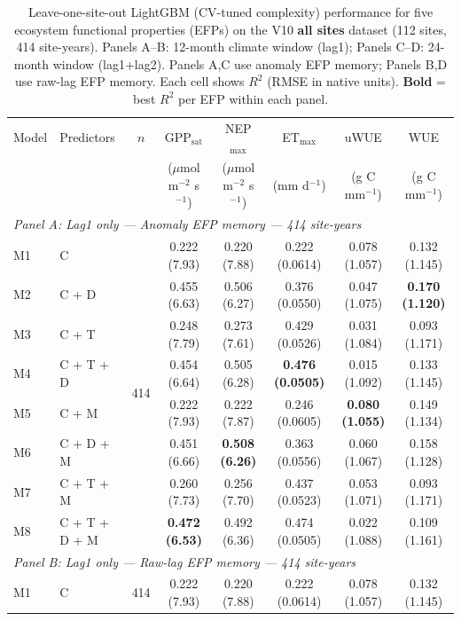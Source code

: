 \begin{table}[htbp]
\centering
\caption{Leave-one-site-out LightGBM (CV-tuned complexity) performance for five ecosystem functional properties (EFPs) on the V10 \textbf{all sites} dataset (112 sites, 414 site-years). Panels A--B: 12-month climate window (lag1); Panels C--D: 24-month window (lag1+lag2). Panels A,C use anomaly EFP memory; Panels B,D use raw-lag EFP memory. Each cell shows $R^2$ (RMSE in native units). \textbf{Bold} = best $R^2$ per EFP within each panel.}
\label{tab:LGBtuned_LOSO_v10_all_sites}
\footnotesize
\setlength{\tabcolsep}{4pt}
\begin{tabular}{llcccccc}
\toprule
Model & Predictors & $n$ & GPP$_\mathrm{sat}$ & NEP$_\mathrm{max}$ & ET$_\mathrm{max}$ & uWUE & WUE \\
  &  &  & ($\mu$mol m$^{-2}$ s$^{-1}$) & ($\mu$mol m$^{-2}$ s$^{-1}$) & (mm d$^{-1}$) & (g C mm$^{-1}$) & (g C mm$^{-1}$) \\
\midrule
\multicolumn{8}{l}{\textit{Panel A: Lag1 only --- Anomaly EFP memory --- 414 site-years}} \\
\midrule
M1 & C & \multirow{8}{*}{414} & 0.222 (7.93) & 0.220 (7.88) & 0.222 (0.0614) & 0.078 (1.057) & 0.132 (1.145) \\
M2 & C + D &  & 0.455 (6.63) & 0.506 (6.27) & 0.376 (0.0550) & 0.047 (1.075) & \textbf{0.170 (1.120)} \\
M3 & C + T &  & 0.248 (7.79) & 0.273 (7.61) & 0.429 (0.0526) & 0.031 (1.084) & 0.093 (1.171) \\
M4 & C + T + D &  & 0.454 (6.64) & 0.505 (6.28) & \textbf{0.476 (0.0505)} & 0.015 (1.092) & 0.133 (1.145) \\
M5 & C + M &  & 0.222 (7.93) & 0.222 (7.87) & 0.246 (0.0605) & \textbf{0.080 (1.055)} & 0.149 (1.134) \\
M6 & C + D + M &  & 0.451 (6.66) & \textbf{0.508 (6.26)} & 0.363 (0.0556) & 0.060 (1.067) & 0.158 (1.128) \\
M7 & C + T + M &  & 0.260 (7.73) & 0.256 (7.70) & 0.437 (0.0523) & 0.053 (1.071) & 0.093 (1.171) \\
M8 & C + T + D + M &  & \textbf{0.472 (6.53)} & 0.492 (6.36) & 0.474 (0.0505) & 0.022 (1.088) & 0.109 (1.161) \\
\midrule
\multicolumn{8}{l}{\textit{Panel B: Lag1 only --- Raw-lag EFP memory --- 414 site-years}} \\
\midrule
M1 & C & \multirow{8}{*}{414} & 0.222 (7.93) & 0.220 (7.88) & 0.222 (0.0614) & 0.078 (1.057) & 0.132 (1.145) \\

\end{tabular}
\end{table}
